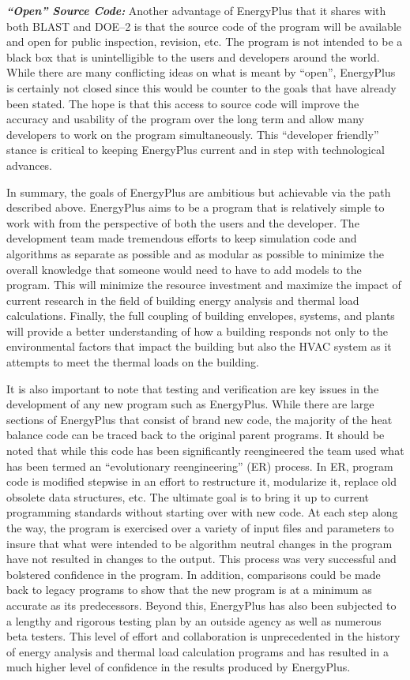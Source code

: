 \textbf{\emph{``Open'' Source Code:}} Another advantage of EnergyPlus that it shares with both BLAST and DOE--2 is that the source code of the program will be available and open for public inspection, revision, etc. The program is not intended to be a black box that is unintelligible to the users and developers around the world. While there are many conflicting ideas on what is meant by ``open'', EnergyPlus is certainly not closed since this would be counter to the goals that have already been stated. The hope is that this access to source code will improve the accuracy and usability of the program over the long term and allow many developers to work on the program simultaneously. This ``developer friendly'' stance is critical to keeping EnergyPlus current and in step with technological advances.

In summary, the goals of EnergyPlus are ambitious but achievable via the path described above. EnergyPlus aims to be a program that is relatively simple to work with from the perspective of both the users and the developer. The development team made tremendous efforts to keep simulation code and algorithms as separate as possible and as modular as possible to minimize the overall knowledge that someone would need to have to add models to the program. This will minimize the resource investment and maximize the impact of current research in the field of building energy analysis and thermal load calculations. Finally, the full coupling of building envelopes, systems, and plants will provide a better understanding of how a building responds not only to the environmental factors that impact the building but also the HVAC system as it attempts to meet the thermal loads on the building.

It is also important to note that testing and verification are key issues in the development of any new program such as EnergyPlus. While there are large sections of EnergyPlus that consist of brand new code, the majority of the heat balance code can be traced back to the original parent programs. It should be noted that while this code has been significantly reengineered the team used what has been termed an ``evolutionary reengineering'' (ER) process. In ER, program code is modified stepwise in an effort to restructure it, modularize it, replace old obsolete data structures, etc. The ultimate goal is to bring it up to current programming standards without starting over with new code. At each step along the way, the program is exercised over a variety of input files and parameters to insure that what were intended to be algorithm neutral changes in the program have not resulted in changes to the output. This process was very successful and bolstered confidence in the program. In addition, comparisons could be made back to legacy programs to show that the new program is at a minimum as accurate as its predecessors. Beyond this, EnergyPlus has also been subjected to a lengthy and rigorous testing plan by an outside agency as well as numerous beta testers. This level of effort and collaboration is unprecedented in the history of energy analysis and thermal load calculation programs and has resulted in a much higher level of confidence in the results produced by EnergyPlus.
